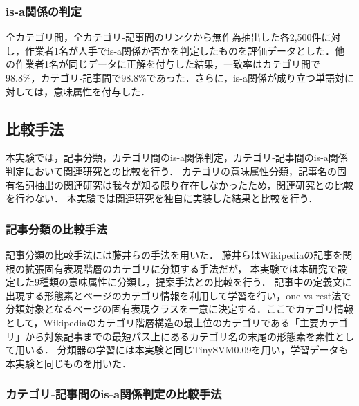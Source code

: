 \documentclass[japanese]{jnlp_1.4}
\begin{document}
\subsubsection{is-a関係の判定}

全カテゴリ間，全カテゴリ‐記事間のリンクから無作為抽出した各2,500件に対し，作業者1名が人手でis-a関係か否かを判定したものを評価データとした．他の作業者1名が同じデータに正解を付与した結果，一致率はカテゴリ間で98.8\%，カテゴリ‐記事間で98.8\%であった．さらに，is-a関係が成り立つ単語対に対しては，意味属性を付与した．


\subsection{比較手法}

本実験では，記事分類，カテゴリ間のis-a関係判定，カテゴリ‐記事間のis-a関係判定において関連研究との比較を行う．
カテゴリの意味属性分類，記事名の固有名詞抽出の関連研究は我々が知る限り存在しなかったため，関連研究との比較を行わない．
本実験では関連研究を独自に実装した結果と比較を行う．


\subsubsection{記事分類の比較手法}

記事分類の比較手法には藤井ら\citeyear{Fujii}の手法を用いた． 
藤井らはWikipediaの記事を関根の拡張固有表現階層のカテゴリに分類する手法だが，
本実験では本研究で設定した9種類の意味属性に分類し，提案手法との比較を行う．
記事中の定義文に出現する形態素とページのカテゴリ情報を利用して学習を行い，one-vs-rest法で分類対象となるページの固有表現クラスを一意に決定する．ここでカテゴリ情報として，Wikipediaのカテゴリ階層構造の最上位のカテゴリである「主要カテゴリ」から対象記事までの最短パス上にあるカテゴリ名の末尾の形態素を素性として用いる．
分類器の学習には本実験と同じTinySVM0.09を用い，学習データも本実験と同じものを用いた．


\subsubsection{カテゴリ‐記事間のis-a関係判定の比較手法}
\end{document}
